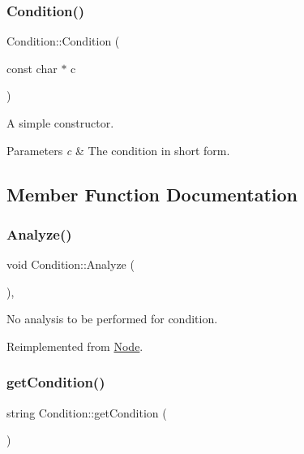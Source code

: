 \subsubsection{\texorpdfstring{Condition()}{Condition()}}
{\footnotesize\ttfamily Condition\+::\+Condition (\begin{DoxyParamCaption}\item[{const char $\ast$}]{c }\end{DoxyParamCaption})}

A simple constructor. 
\begin{DoxyParams}{Parameters}
{\em c} & The condition in short form. \\
\hline
\end{DoxyParams}


\subsection{Member Function Documentation}
\mbox{\label{class_condition_a899d0ab9bddcbe9f23bf0c8af84d7d10}} 
\subsubsection{\texorpdfstring{Analyze()}{Analyze()}}
{\footnotesize\ttfamily void Condition\+::\+Analyze (\begin{DoxyParamCaption}{ }\end{DoxyParamCaption})\hspace{0.3cm}{\ttfamily [inline]}, {\ttfamily [virtual]}}

No analysis to be performed for condition. 

Reimplemented from \hyperlink{class_node_a5f88d55c6f253a29def7ccc443d83d47}{Node}.

\mbox{\label{class_condition_a2089bf7976fb6f35a8c926d3c5722cc7}} 
\subsubsection{\texorpdfstring{get\+Condition()}{getCondition()}}
{\footnotesize\ttfamily string Condition\+::get\+Condition (\begin{DoxyParamCaption}{ }\end{DoxyParamCaption})\hspace{0.3cm}{\ttfamily [inline]}}

